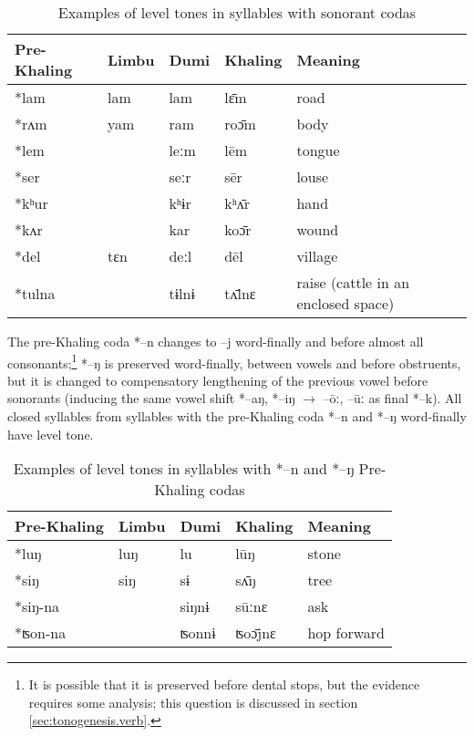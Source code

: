 \documentclass[oldfontcommands,oneside,a4paper,11pt]{article}
\newcommand{\ipa}[1]{{\phon \mbox{#1}}} %
\begin{document}
\begin{table}[H]
\caption{Examples of level tones in syllables with sonorant codas} \centering
\begin{tabular}{lllll}
\toprule
Pre-Khaling	&Limbu	&Dumi	&Khaling	&Meaning\\
\midrule
\ipa{*lam}	&\ipa{lam} & \ipa{lam}	 & \ipa{lɛ̄m}	& road  \\
\ipa{*rʌm}	&\ipa{yam} & \ipa{ram}	 & \ipa{roɔ̄m}	& body  \\
\ipa{*lem} & & \ipa{leːm}	 & \ipa{lēm}	& tongue  \\
\midrule
\ipa{*ser} & & \ipa{seːr}	 & \ipa{sēr}	& louse  \\
\ipa{*kʰur}	&  & \ipa{kʰɨr}	 & \ipa{kʰʌ̄r}	& hand  \\
\ipa{*kʌr}	&  &\ipa{kar}	 & \ipa{koɔ̄r}	& wound  \\
\midrule
 \ipa{*del}	&\ipa{tɛn} & \ipa{deːl}	 & \ipa{dēl}	& village  \\
 \ipa{*tulna}	&  & \ipa{tɨlnɨ}	 & \ipa{tʌ̄lnɛ}	& raise (cattle in an enclosed space)  \\
\bottomrule
\end{tabular}
\end{table}

The  pre-Khaling coda \ipa{*--n} changes to \ipa{--j} word-finally and before almost all consonants;\footnote{It is possible that it is preserved before dental stops, but the evidence requires some analysis; this question is discussed in section \ref{sec:tonogenesis.verb}.} \ipa{*--ŋ} is preserved word-finally, between vowels and before obstruents, but it is changed to compensatory lengthening of the previous vowel before sonorants (inducing the same vowel shift \ipa{*--aŋ}, \ipa{*--iŋ} $\rightarrow$ \ipa{--ōː}, \ipa{--ūː} as final \ipa{*--k}). All closed syllables from syllables with the pre-Khaling coda \ipa{*--n} and \ipa{*--ŋ} word-finally have level tone.
\begin{table}[H]
\caption{Examples of level tones in syllables with \ipa{*--n} and \ipa{*--ŋ} Pre-Khaling codas} \centering
\begin{tabular}{lllll}
\toprule
Pre-Khaling	&Limbu	&Dumi	&Khaling	&Meaning\\
\midrule
\ipa{*luŋ}	&\ipa{luŋ} & \ipa{lu}	 & \ipa{lūŋ}	& stone  \\
\ipa{*siŋ}	&\ipa{siŋ} & \ipa{sɨ}	 & \ipa{sʌ̄ŋ}	& tree  \\
\ipa{*siŋ-na}	&  & \ipa{siŋnɨ}	 & \ipa{sūːnɛ}	& ask  \\
\ipa{*ʦon-na}	&  & \ipa{ʦonnɨ}	 & \ipa{ʦoɔ̄jnɛ}	& hop forward  \\

\bottomrule
\end{tabular}
\end{table}
\end{document}
